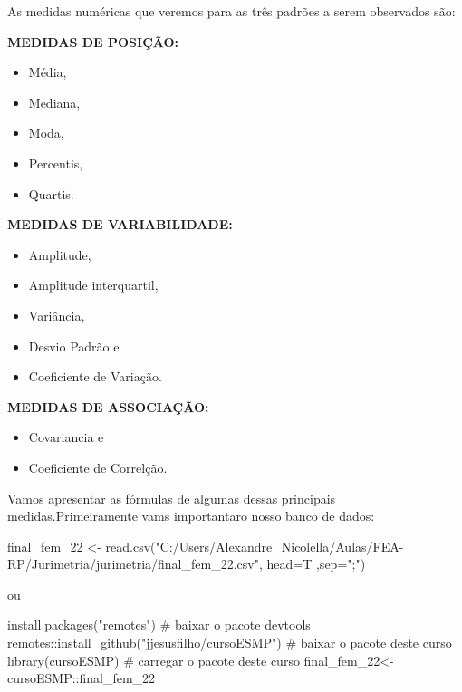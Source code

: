 \documentclass[
  letterpaper,
  DIV=11,
  numbers=noendperiod]{scrreprt}
\newenvironment{Shaded}{\begin{snugshade}}{\end{snugshade}}
\newcommand{\AttributeTok}[1]{\textcolor[rgb]{0.40,0.45,0.13}{#1}}
\newcommand{\CommentTok}[1]{\textcolor[rgb]{0.37,0.37,0.37}{#1}}
\newcommand{\FunctionTok}[1]{\textcolor[rgb]{0.28,0.35,0.67}{#1}}
\newcommand{\NormalTok}[1]{\textcolor[rgb]{0.00,0.23,0.31}{#1}}
\newcommand{\OtherTok}[1]{\textcolor[rgb]{0.00,0.23,0.31}{#1}}
\newcommand{\SpecialCharTok}[1]{\textcolor[rgb]{0.37,0.37,0.37}{#1}}
\newcommand{\StringTok}[1]{\textcolor[rgb]{0.13,0.47,0.30}{#1}}
\providecommand{\tightlist}{%
  \setlength{\itemsep}{0pt}\setlength{\parskip}{0pt}}
\begin{document}
As medidas numéricas que veremos para as três padrões a serem observados
são:

\textbf{MEDIDAS DE POSIÇÃO:}

\begin{itemize}
\tightlist
\item
  Média,
\item
  Mediana,
\item
  Moda,
\item
  Percentis,
\item
  Quartis.
\end{itemize}

\textbf{MEDIDAS DE VARIABILIDADE:}

\begin{itemize}
\tightlist
\item
  Amplitude,
\item
  Amplitude interquartil,
\item
  Variância,
\item
  Desvio Padrão e
\item
  Coeficiente de Variação.
\end{itemize}

\textbf{MEDIDAS DE ASSOCIAÇÃO:}

\begin{itemize}
\tightlist
\item
  Covariancia e
\item
  Coeficiente de Correlção.
\end{itemize}

Vamos apresentar as fórmulas de algumas dessas principais
medidas.Primeiramente vams importantaro nosso banco de dados:

\begin{Shaded}
\begin{Highlighting}[]
\NormalTok{final\_fem\_22 }\OtherTok{\textless{}{-}} \FunctionTok{read.csv}\NormalTok{(}\StringTok{"C:/Users/Alexandre\_Nicolella/Aulas/FEA{-}RP/Jurimetria/jurimetria/final\_fem\_22.csv"}\NormalTok{, }\AttributeTok{head=}\NormalTok{T ,}\AttributeTok{sep=}\StringTok{";"}\NormalTok{)}
\end{Highlighting}
\end{Shaded}

ou

\begin{Shaded}
\begin{Highlighting}[]
\FunctionTok{install.packages}\NormalTok{(}\StringTok{"remotes"}\NormalTok{) }\CommentTok{\# baixar o pacote devtools}
\NormalTok{remotes}\SpecialCharTok{::}\FunctionTok{install\_github}\NormalTok{(}\StringTok{"jjesusfilho/cursoESMP"}\NormalTok{) }\CommentTok{\# baixar o pacote deste curso}
\FunctionTok{library}\NormalTok{(cursoESMP) }\CommentTok{\# carregar o pacote deste curso}
\NormalTok{final\_fem\_22}\OtherTok{\textless{}{-}}\NormalTok{cursoESMP}\SpecialCharTok{::}\NormalTok{final\_fem\_22}
\end{Highlighting}
\end{Shaded}
\end{document}
